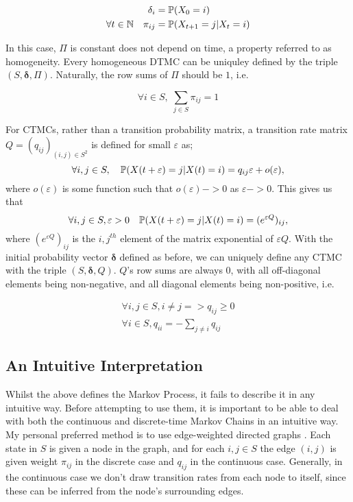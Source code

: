 \begin{align*}
\delta_i &= \mathbb{P} (X_0 = i) \\
 \forall t \in \mathbb{N} \quad \pi_{ij} &= \mathbb{P}(X_{t+1} = j | X_t = i)
\end{align*}

In this case, $\Pi$ is constant does not depend on time, a property referred to as homogeneity. Every homogeneous DTMC can be uniquley defined by the triple $(S,\bm{\delta},\Pi)$. Naturally, the row sums of $\Pi$ should be $1$, i.e.

$$
\forall i \in S, \; \sum_{j \in S} \pi_{ij} = 1
$$

For CTMCs, rather than a transition probability matrix, a transition rate matrix $Q = (q_{ij})_{(i,j) \in S^2}$ is defined for small $\varepsilon$ as;
$$
\forall i,j \in S, \quad \mathbb{P} (X(t+\varepsilon)=j|X(t)=i) = q_{ij}\varepsilon + o(\varepsilon),
$$
where $o(\varepsilon)$ is some function such that $o(\varepsilon) -> 0$ as $\varepsilon -> 0$. This gives us that
$$
\forall i,j \in S, \varepsilon>0 \quad \mathbb{P} (X(t+\varepsilon)=j|X(t)=i) = (e^{\varepsilon Q})_{ij},
$$
where $(e^{\varepsilon Q})_{ij}$ is the $i,j^{th}$ element of the matrix exponential of $\varepsilon Q$. With the initial probability vector $\bm{\delta}$ defined as before, we can uniquely define any CTMC with the triple $(S,\bm{\delta},Q)$. $Q$'s row sums are always 0, with all off-diagonal elements being non-negative, and all diagonal elements being non-positive, i.e.

\begin{align*}
\forall i,j \in S, i \neq j => q_{ij} \geqslant 0 \\
\forall i \in S, q_{ii} = -\sum_{j \neq i} q_{ij}
\end{align*}

\subsection{An Intuitive Interpretation}

Whilst the above defines the Markov Process, it fails to describe it in any intuitive way. Before attempting to use them, it is important to be able to deal with both the continuous and discrete-time Markov Chains in an intuitive way. My personal preferred method is to use edge-weighted directed graphs \cite{mwgraph}. Each state in $S$ is given a node in the graph, and for each $i,j \in S$ the edge $(i,j)$ is given weight $\pi_{ij}$ in the discrete case and $q_{ij}$ in the continuous case. Generally, in the continuous case we don't draw transition rates from each node to itself, since these can be inferred from the node's surrounding edges.

